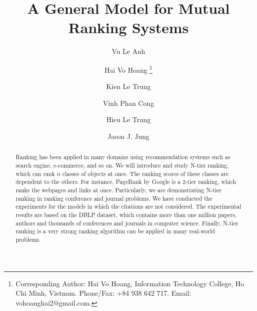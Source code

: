\documentclass[lnicst]{svmultln}
\begin{document}
%
\mainmatter              %
%
\title{A General Model for Mutual Ranking Systems}
%
%
\author{Vu Le Anh\and Hai Vo Hoang \thanks{Corresponding Author: Hai Vo Hoang, Information Technology College, Ho Chi Minh, Vietnam. Phone/Fax: +84 938 642 717. Email: vohoanghai2@gmail.com.}\and Kien Le Trung\and Vinh Phan Cong\and Hieu Le Trung \and
Jason J. Jung}

%
%
%

\maketitle

\begin{abstract}
Ranking has been applied in many domains using recommendation systems such as search engine, e-commerce, and so on.
We will introduce and study N-tier ranking, which can rank $n$ classes of objects at once. The ranking scores of these classes are dependent to the others. For instance, PageRank by Google is a 2-tier ranking, which ranks the webpages and links at once.  
Particularly, we are demonstrating N-tier ranking in ranking conference and journal problems. We have conducted the experiments for the models in which the citations are not considered. The experimental results are based on the DBLP dataset, which contains more than one million papers, authors and thousands of conferences and journals in computer science. Finally,
N-tier ranking is a very strong ranking algorithm can be applied in many real-world problems.

\end{abstract}
%
\end{document}
